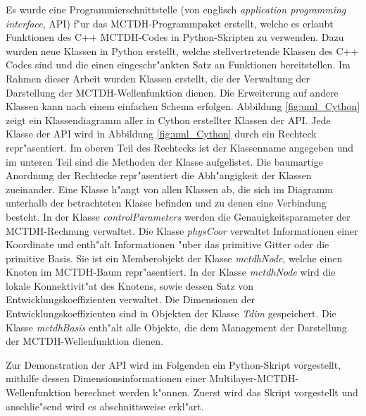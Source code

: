 Es wurde eine Programmierschnittstelle (von englisch \textit{application programming interface}, API) f"ur das MCTDH-Programmpaket erstellt,
welche es erlaubt Funktionen des C++ MCTDH-Codes in Python-Skripten zu verwenden.
Dazu wurden neue Klassen in Python erstellt, welche stellvertretende Klassen des C++ Codes sind 
und die einen eingeschr"ankten Satz an Funktionen bereitstellen.
Im Rahmen dieser Arbeit wurden Klassen erstellt, die der Verwaltung der Darstellung der MCTDH-Wellenfunktion die\-nen.
Die Erweiterung auf andere Klassen kann nach einem einfachen Schema erfolgen.
Abbildung \ref{fig:uml_Cython} zeigt ein Klassendiagramm aller in Cython erstellter Klassen der API.
Jede Klasse der API wird in Abbildung \ref{fig:uml_Cython} durch ein Rechteck repr"asentiert.
Im oberen Teil des Rechtecks ist der Klassenname angegeben und im unteren Teil sind die Methoden der Klasse aufgelistet.
Die baumartige Anordnung der Rechtecke repr"asentiert die Abh"angigkeit der Klassen zueinander. Eine Klasse h"angt von
allen Klassen ab, die sich im Diagramm unterhalb der betrachteten Klasse befinden und zu denen eine Verbindung besteht.
In der Klasse \textit{controlParameters} werden die Genauigkeitspara\-meter der MCTDH-Rechnung verwaltet. 
Die Klasse \textit{physCoor} verwaltet Informationen einer Koordinate und enth"alt Informationen "uber das primitive Gitter oder
die primitive Basis. Sie ist ein Memberobjekt der Klasse \textit{mctdhNode}, welche einen Knoten im MCTDH-Baum 
repr"asentiert. In der Klasse \textit{mctdhNode} wird die lokale Konnektivit"at des Knotens, sowie dessen Satz von
Entwicklungskoeffizienten verwaltet. Die Dimensionen der Entwicklungskoeffizienten sind in Objekten der Klasse
\textit{Tdim} gespeichert. Die Klasse \textit{mctdhBasis} enth"alt alle Objekte, die dem Management der Darstellung der
MCTDH-Wellenfunktion dienen.

Zur Demonstration der API wird im Folgenden ein Python-Skript vorgestellt, mithilfe dessen Dimensionsinformationen
einer Multilayer-MCTDH-Wellenfunktion berechnet werden k"onnen. Zuerst wird das Skript vorgestellt und 
anschlie"send wird es abschnittsweise erkl"art.

